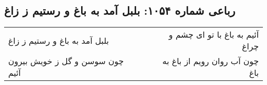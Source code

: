 \begin{center}
\section*{رباعی شماره ۱۰۵۴: بلبل آمد به باغ و رستیم ز زاغ}
\label{sec:1054}
\begin{longtable}{l p{0.5cm} r}
بلبل آمد به باغ و رستیم ز زاغ
&&
آئیم به باغ با تو ای چشم و چراغ
\\
چون سوسن و گل ز خویش بیرون آئیم
&&
چون آب روان رویم از باغ به باغ
\\
\end{longtable}
\end{center}
